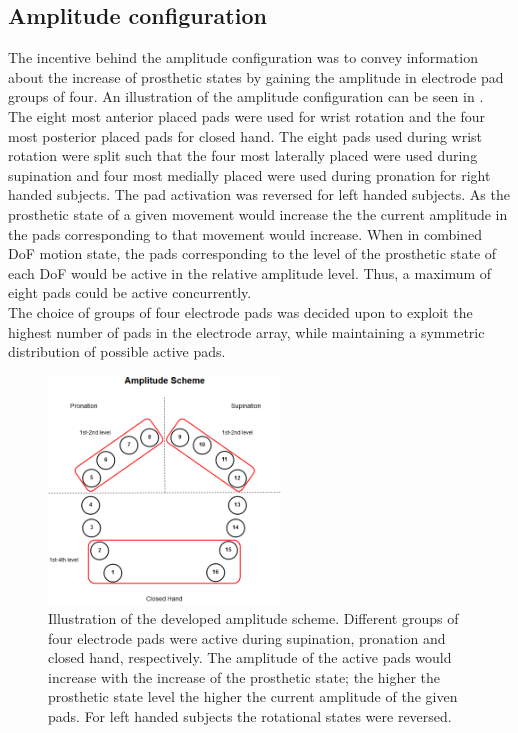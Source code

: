 \subsection{Amplitude configuration}
The incentive behind the amplitude configuration was to convey information about the increase of prosthetic states by gaining the amplitude in electrode pad groups of four. An illustration of the amplitude configuration can be seen in . \\ 
The eight most anterior placed pads were used for wrist rotation and the four most posterior placed pads for closed hand. The eight pads used during wrist rotation were split such that the four most laterally placed were used during supination and four most medially placed were used during pronation for right handed subjects. The pad activation was reversed for left handed subjects. As the prosthetic state of a given movement would increase the the current amplitude in the pads corresponding to that movement would increase. When in combined DoF motion state, the pads corresponding to the level of the prosthetic state of each DoF would be active in the relative amplitude level. Thus, a maximum of eight pads could be active concurrently. \\
The choice of groups of four electrode pads was decided upon to exploit the highest number of pads in the electrode array, while maintaining a symmetric distribution of possible active pads.

\begin{figure}[H]                 
	\includegraphics[width=0.55\textwidth]{figures/El_array_amplitude}  
	\caption{Illustration of the developed amplitude scheme. Different groups of four electrode pads were active during supination, pronation and closed hand, respectively. The amplitude of the active pads would increase with the increase of the prosthetic state; the higher the prosthetic state level the higher the current amplitude of the given pads. For left handed subjects the rotational states were reversed.}
	\label{fig:pa:amplitude} 
\end{figure}











